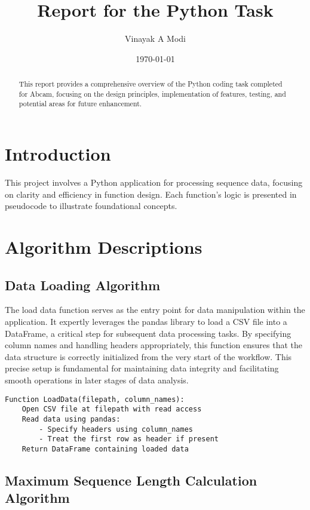 \documentclass[12pt]{article}
\title{Report for the Python Task}
\author{Vinayak A Modi}
\date{\today}
\begin{document}
\maketitle

\begin{abstract}
This report provides a comprehensive overview of the Python coding task completed for Abcam, focusing on the design principles, implementation of features, testing, and potential areas for future enhancement.
\end{abstract}

\section{Introduction}
This project involves a Python application for processing sequence data, focusing on clarity and efficiency in function design. Each function's logic is presented in pseudocode to illustrate foundational concepts.

\section{Algorithm Descriptions}
\subsection{Data Loading Algorithm}

The load data function serves as the entry point for data manipulation within the application. It expertly leverages the pandas library to load a CSV file into a DataFrame, a critical step for subsequent data processing tasks. By specifying column names and handling headers appropriately, this function ensures that the data structure is correctly initialized from the very start of the workflow. This precise setup is fundamental for maintaining data integrity and facilitating smooth operations in later stages of data analysis.

\begin{lstlisting}[caption=Pseudocode: Load Data Function]
Function LoadData(filepath, column_names):
    Open CSV file at filepath with read access
    Read data using pandas:
        - Specify headers using column_names
        - Treat the first row as header if present
    Return DataFrame containing loaded data
\end{lstlisting}

\subsection{Maximum Sequence Length Calculation Algorithm}
\end{document}
